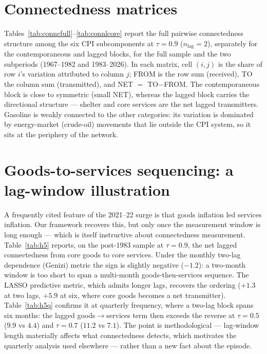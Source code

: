 \documentclass{article}
\begin{document}
\section{Connectedness matrices}
Tables~\ref{tab:conncfull}--\ref{tab:connlcore} report the full pairwise connectedness structure
among the six CPI subcomponents at $\tau=0.9$ ($n_{\text{lag}}=2$), separately for the
contemporaneous and lagged blocks, for the full sample and the two subperiods (1967--1982 and
1983--2026). In each matrix, cell $(i,j)$ is the share of row $i$'s variation attributed to column
$j$; FROM is the row sum (received), TO the column sum (transmitted), and NET $=$ TO$-$FROM. The
contemporaneous block is close to symmetric (small NET), whereas the lagged block carries the
directional structure --- shelter and core services are the net lagged transmitters. Gasoline is
weakly connected to the other categories: its variation is dominated by energy-market (crude-oil)
movements that lie outside the CPI system, so it sits at the periphery of the network.








\section{Goods-to-services sequencing: a lag-window illustration}\label{app:seq}
A frequently cited feature of the 2021--22 surge is that goods inflation led services inflation.
Our framework recovers this, but only once the measurement window is long enough --- which is itself
instructive about connectedness measurement. Table~\ref{tab:h5} reports, on the post-1983 sample at
$\tau=0.9$, the net lagged connectedness from core goods to core services. Under the monthly two-lag
dependence (Genizi) metric the sign is slightly negative ($-1.2$): a two-month window is too short
to span a multi-month goods-then-services sequence. The LASSO predictive metric, which admits longer
lags, recovers the ordering ($+1.3$ at two lags, $+5.9$ at six, where core goods becomes a net
transmitter). Table~\ref{tab:h5q} confirms it at quarterly frequency, where a two-lag block spans
six months: the lagged goods$\to$services term then exceeds the reverse at $\tau=0.5$ ($9.9$ vs
$4.4$) and $\tau=0.7$ ($11.2$ vs $7.1$). The point is methodological --- lag-window length
materially affects what connectedness detects, which motivates the quarterly analysis used elsewhere
--- rather than a new fact about the episode.
\end{document}
